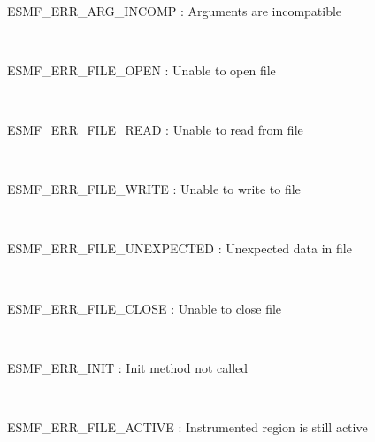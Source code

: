 \mbox{}\hrulefill\ 
 

  ESMF\_ERR\_ARG\_INCOMP : Arguments are incompatible 
 
\mbox{}\hrulefill\ 
 

  ESMF\_ERR\_FILE\_OPEN : Unable to open file 
 
\mbox{}\hrulefill\ 
 

  ESMF\_ERR\_FILE\_READ : Unable to read from file 
 
\mbox{}\hrulefill\ 
 

  ESMF\_ERR\_FILE\_WRITE : Unable to write to file 
 
\mbox{}\hrulefill\ 
 

  ESMF\_ERR\_FILE\_UNEXPECTED : Unexpected data in file 
 
\mbox{}\hrulefill\ 
 

  ESMF\_ERR\_FILE\_CLOSE : Unable to close file 
 
\mbox{}\hrulefill\ 
 

  ESMF\_ERR\_INIT : Init method not called 
 
\mbox{}\hrulefill\ 
 

  ESMF\_ERR\_FILE\_ACTIVE : Instrumented region  is still active
